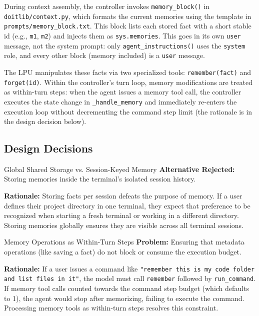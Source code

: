 \documentclass[11pt,a4paper]{article}
\begin{document}
During context assembly, the controller invokes \texttt{memory\_block()} in \texttt{doitlib/context.py}, which formats the current memories using the template in \texttt{prompts/memory\_block.txt}. This block lists each stored fact with a short stable id (e.g., \texttt{m1}, \texttt{m2}) and injects them as \texttt{sys.memories}. This goes in its own \texttt{user} message, not the system prompt: only \texttt{agent\_instructions()} uses the \texttt{system} role, and every other block (memory included) is a \texttt{user} message.

The LPU manipulates these facts via two specialized tools: \texttt{remember(fact)} and \texttt{forget(id)}. Within the controller's turn loop, memory modifications are treated as within-turn steps: when the agent issues a memory tool call, the controller executes the state change in \texttt{\_handle\_memory} and immediately re-enters the execution loop without decrementing the command step limit (the rationale is in the design decision below).

\subsection{Design Decisions}

\begin{decisionbox}{Global Shared Storage vs. Session-Keyed Memory}
    \textbf{Alternative Rejected:} Storing memories inside the terminal's isolated session history.
    
    \textbf{Rationale:} Storing facts per session defeats the purpose of memory. If a user defines their project directory in one terminal, they expect that preference to be recognized when starting a fresh terminal or working in a different directory. Storing memories globally ensures they are visible across all terminal sessions.
\end{decisionbox}

\begin{decisionbox}{Memory Operations as Within-Turn Steps}
    \textbf{Problem:} Ensuring that metadata operations (like saving a fact) do not block or consume the execution budget.
    
    \textbf{Rationale:} If a user issues a command like \texttt{"remember this is my code folder and list files in it"}, the model must call \texttt{remember} followed by \texttt{run\_command}. If memory tool calls counted towards the command step budget (which defaults to 1), the agent would stop after memorizing, failing to execute the command. Processing memory tools as within-turn steps resolves this constraint.
\end{decisionbox}
\end{document}
